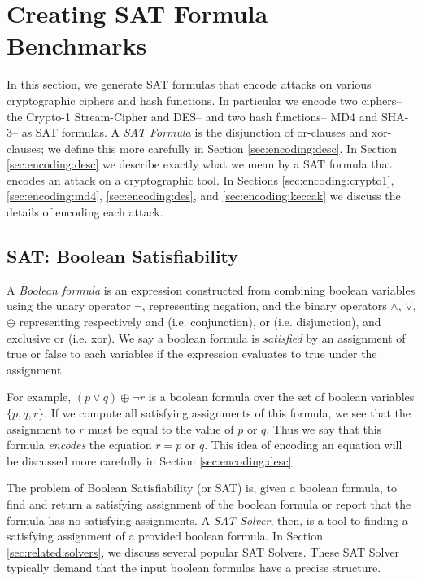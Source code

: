 \section{Creating SAT Formula Benchmarks}
\label{sec:encoding}

In this section, we generate SAT formulas that encode attacks on various cryptographic ciphers and hash functions. In particular we encode two ciphers-- the Crypto-1 Stream-Cipher and DES-- and two hash functions-- MD4 and SHA-3-- as SAT formulas. A \emph{SAT Formula} is the disjunction of or-clauses and xor-clauses; we define this more carefully in Section \ref{sec:encoding:desc}. In Section \ref{sec:encoding:desc} we describe exactly what we mean by a SAT formula that encodes an attack on a cryptographic tool. In Sections \ref{sec:encoding:crypto1}, \ref{sec:encoding:md4}, \ref{sec:encoding:des}, and \ref{sec:encoding:keccak} we discuss the details of encoding each attack.

\subsection{SAT: Boolean Satisfiability}
\label{sec:encoding:sat}

A \emph{Boolean formula} is an expression constructed from combining boolean variables using the unary operator $\neg$, representing negation, and the binary operators $\land$, $\lor$, $\oplus$ representing respectively and (i.e. conjunction), or (i.e. disjunction), and exclusive or (i.e. xor). We say a boolean formula is \emph{satisfied} by an assignment of true or false to each variables if the expression evaluates to true under the assignment.

For example, $(p \lor q) \oplus \neg r$ is a boolean formula over the set of boolean variables $\{p, q, r\}$. If we compute all satisfying assignments of this formula, we see that the assignment to $r$ must be equal to the value of $p \text{ or } q$. Thus we say that this formula \emph{encodes} the equation $r = p \text{ or } q$. This idea of encoding an equation will be discussed more carefully in Section \ref{sec:encoding:desc}

The problem of Boolean Satisfiability (or SAT) is, given a boolean formula, to find and return a satisfying assignment of the boolean formula or report that the formula has no satisfying assignments. A \emph{SAT Solver}, then, is a tool to finding a satisfying assignment of a provided boolean formula. In Section \ref{sec:related:solvers}, we discuss several popular SAT Solvers. These SAT Solver typically demand that the input boolean formulas have a precise structure. 

